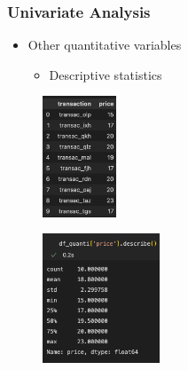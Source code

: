 \begin{frame}\frametitle{Univariate Analysis}
   \begin{minipage}{0.48\linewidth}
      \begin{itemize}
         \item Other quantitative variables
         \begin{itemize}
            \item Descriptive statistics
         \end{itemize}
      \end{itemize}
      \vspace{.5cm}
      \begin{figure}[H]
         \includegraphics[width=2.2cm]{../images/illustrations/pattern_univariate_quantitative_df.png}
      \end{figure}
   \end{minipage}
   \begin{minipage}{0.48\linewidth}
      \begin{figure}[H]
         \includegraphics[width=3.5cm]{../images/illustrations/pattern_univariate_quantitative_describe.png}
      \end{figure}
   \end{minipage}
\end{frame}



